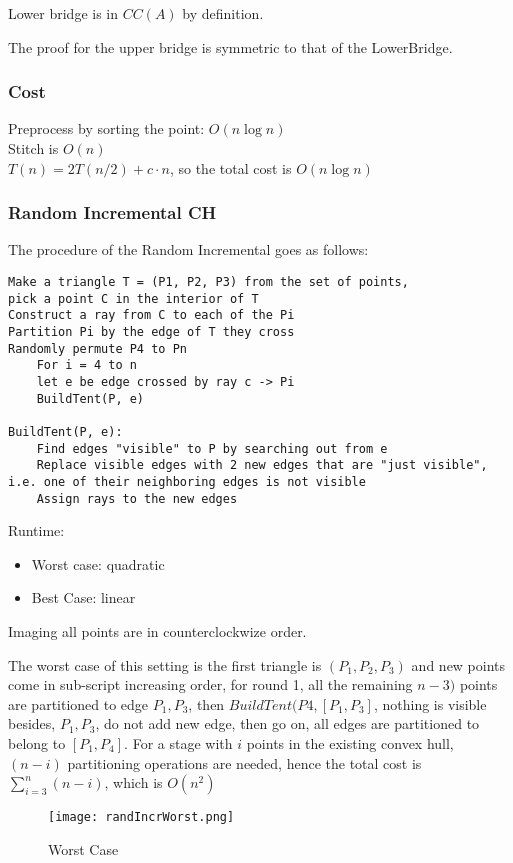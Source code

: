 \documentclass[12pt]{article}
\begin{document}
Lower bridge is in $CC(A)$ by definition.

The proof for the upper bridge is symmetric to that of the LowerBridge.
\subsubsection{Cost}
Preprocess by sorting the point: $O(n \log n)$
\\Stitch is $O(n)$
\\$T(n) = 2T(n/2) + c \cdot n$, so the total cost is $O(n \log n)$

\subsubsection{Random Incremental CH}
The procedure of the Random Incremental goes as follows:
\begin{verbatim}
Make a triangle T = (P1, P2, P3) from the set of points, 
pick a point C in the interior of T
Construct a ray from C to each of the Pi
Partition Pi by the edge of T they cross
Randomly permute P4 to Pn
    For i = 4 to n
    let e be edge crossed by ray c -> Pi
    BuildTent(P, e)

BuildTent(P, e):
    Find edges "visible" to P by searching out from e
    Replace visible edges with 2 new edges that are "just visible", i.e. one of their neighboring edges is not visible
    Assign rays to the new edges
\end{verbatim}

Runtime:\\
\begin{itemize}
\item Worst case: quadratic
\item Best Case: linear
\end{itemize}

Imaging all points are in counterclockwize order.

The worst case of this setting is the first triangle is
$(P_1, P_2, P_3)$ and new points come in sub-script increasing order,
for round 1, all the remaining $n - 3)$ points are partitioned to edge
$P_1, P_3$, then $BuildTent(P4, [P_1, P_3]$, nothing is visible
besides, $P_1, P_3$, do not add new edge, then go on, all edges are
partitioned to belong to $[P_1, P_4]$. For a stage with $i$ points in
the existing convex hull, $(n - i)$ partitioning operations are
needed, hence the total cost is $\sum_{i = 3} ^ n (n - i)$, which is
$O(n^2)$

\begin{figure}[h!]
  \centering
  \texttt{[image: randIncrWorst.png]}
  \caption{Worst Case}
  \label{fig:randIncrWorst}
\end{figure}
\end{document}
